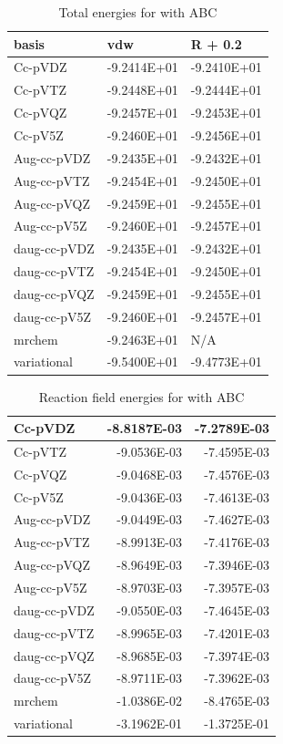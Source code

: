 \documentclass[../master_thesis.tex]{subfiles}
\begin{document}
\begin{table}[htbp]
\caption{Total energies for  with \ac{ABC}}
\begin{tabular}{|l|r|r|}
\hline
basis & \multicolumn{1}{l|}{vdw} & \multicolumn{1}{l|}{R + 0.2} \\ \hline
Cc-pVDZ & -9.2414E+01 & -9.2410E+01 \\ \hline
Cc-pVTZ & -9.2448E+01 & -9.2444E+01 \\ \hline
Cc-pVQZ & -9.2457E+01 & -9.2453E+01 \\ \hline
Cc-pV5Z & -9.2460E+01 & -9.2456E+01 \\ \hline
Aug-cc-pVDZ & -9.2435E+01 & -9.2432E+01 \\ \hline
Aug-cc-pVTZ & -9.2454E+01 & -9.2450E+01 \\ \hline
Aug-cc-pVQZ & -9.2459E+01 & -9.2455E+01 \\ \hline
Aug-cc-pV5Z & -9.2460E+01 & -9.2457E+01 \\ \hline
daug-cc-pVDZ & -9.2435E+01 & -9.2432E+01 \\ \hline
daug-cc-pVTZ & -9.2454E+01 & -9.2450E+01 \\ \hline
daug-cc-pVQZ & -9.2459E+01 & -9.2455E+01 \\ \hline
daug-cc-pV5Z & -9.2460E+01 & -9.2457E+01 \\ \hline
mrchem & -9.2463E+01 & \multicolumn{1}{l|}{N/A} \\ \hline
variational & -9.5400E+01 & -9.4773E+01 \\ \hline
\end{tabular}
\label{tab:cyanrawdataabc}
\end{table}

\begin{table}[htbp]
\caption{Reaction field  energies for  with \ac{ABC}}
\begin{tabular}{|l|r|r|}
\hline
Cc-pVDZ & -8.8187E-03 & -7.2789E-03 \\ \hline
Cc-pVTZ & -9.0536E-03 & -7.4595E-03 \\ \hline
Cc-pVQZ & -9.0468E-03 & -7.4576E-03 \\ \hline
Cc-pV5Z & -9.0436E-03 & -7.4613E-03 \\ \hline
Aug-cc-pVDZ & -9.0449E-03 & -7.4627E-03 \\ \hline
Aug-cc-pVTZ & -8.9913E-03 & -7.4176E-03 \\ \hline
Aug-cc-pVQZ & -8.9649E-03 & -7.3946E-03 \\ \hline
Aug-cc-pV5Z & -8.9703E-03 & -7.3957E-03 \\ \hline
daug-cc-pVDZ & -9.0550E-03 & -7.4645E-03 \\ \hline
daug-cc-pVTZ & -8.9965E-03 & -7.4201E-03 \\ \hline
daug-cc-pVQZ & -8.9685E-03 & -7.3974E-03 \\ \hline
daug-cc-pV5Z & -8.9711E-03 & -7.3962E-03 \\ \hline
mrchem & -1.0386E-02 & -8.4765E-03 \\ \hline
variational & -3.1962E-01 & -1.3725E-01 \\ \hline
\end{tabular}
\label{tab:abcErwat}
\end{table}
\end{document}

